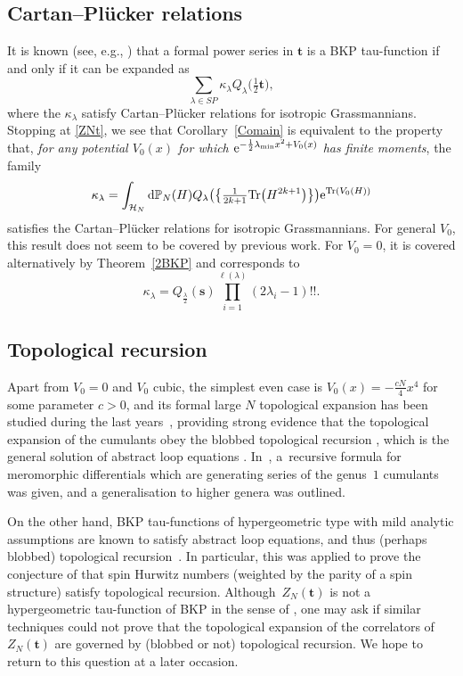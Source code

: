 \documentclass[pdftex]{sigma}
\numberwithin{equation}{section}
\newcommand{\dd}{\mathrm{d}}
\begin{document}
\subsection{Cartan--Pl\"ucker relations} It is known (see, e.g., \cite[Theorem~7.1.1]{harnad_balogh_2021}) that a formal power series in $\mathbf{t}$ is a
BKP tau-function if and only if it can be expanded as
\[
\sum_{\lambda \in SP} \kappa_\lambda
Q_\lambda\bigl(\tfrac{1}{2}\mathbf{t}\bigr),
\]
where the $\kappa_\lambda$ satisfy Cartan--Pl\"ucker relations for isotropic Grassmannians. Stopping at \eqref{ZNt}, we see that Corollary~\ref{Comain} is equivalent to the property that, \emph{for any potential
$V_0(x)$ for which ${\rm e}^{- \frac{1}{2}\lambda_{\min} x^2 + V_0(x)}$ has
finite moments}, the family
\begin{equation*}
\kappa_\lambda= \int_{\mathcal{H}_N} \dd \mathbb{P}_N(H)
 Q_{\lambda}\bigl(\bigl\{\tfrac{1}{2k+1}\mathrm{Tr}\bigl(H^{2k+1}\bigr)\bigr\}\bigr) {\rm e}^{\mathrm{Tr}(V_0(H))}
\end{equation*}
satisfies the Cartan--Pl\"ucker relations for isotropic Grassmannians. For general $V_0$, this result
does not seem to be covered by previous work. For $V_0 = 0$, it is covered alternatively by Theorem~\ref{2BKP} and corresponds to
\[
\kappa_\lambda= Q_{\frac{\lambda}{2}}(\mathbf{s}) \prod_{i = 1}^{\ell(\lambda)} (2\lambda_i - 1)!!.
\]

\subsection{Topological recursion} Apart from $V_0 = 0$ and $V_0$ cubic, the simplest even case is
$V_0(x)= -\frac{cN}{4}x^4$ for some parameter $c > 0$, and its formal
large $N$ topological expansion has been studied during the last years~\mbox{\cite{Grosse:2019jnv, Schurmann:2019mzu}},
providing strong evidence
\cite{Branahl:2020yru} that the topological expansion of the cumulants
obey the blobbed topological recursion \cite{Borot:2015hna}, which is
the general solution of abstract loop equations \cite{Borot:2013lpa}.
In~\cite{Hock:2023nki}, a~recursive formula for meromorphic
differentials which are generating series of the genus~$1$ cumulants
was given, and a generalisation to higher genera was outlined.

On the other hand, BKP tau-functions of hypergeometric type with mild analytic assumptions are known to satisfy abstract loop equations, and thus (perhaps blobbed) topological recursion~\cite{SA}. In particular, this was applied to prove the conjecture of \cite{GKL} that spin Hurwitz numbers (weighted by the parity of a spin structure) satisfy topological recursion. Although~$Z_N(\mathbf{t})$ is not a hypergeometric tau-function of BKP in the sense of \cite{Orlov}, one may ask if similar techniques could not prove that the topological expansion of the correlators of $Z_N(\mathbf{t})$ are governed by (blobbed or not) topological recursion. We hope to return to this question at a later occasion.
\end{document}
